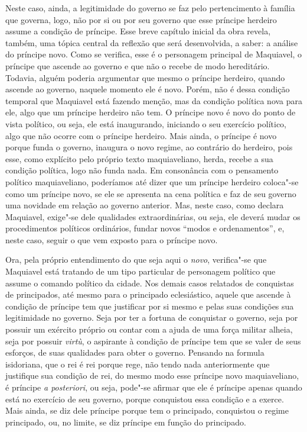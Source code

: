 Neste caso, ainda, a legitimidade do governo se faz pelo pertencimento à
família que governa, logo, não por si ou por seu governo que esse
príncipe herdeiro assume a condição de príncipe. Esse breve capítulo
inicial da obra revela, também, uma tópica central da reflexão que será
desenvolvida, a saber: a análise do príncipe novo. Como se verifica,
esse é o personagem principal de Maquiavel, o príncipe que ascende ao
governo e que não o recebe de modo hereditário. Todavia, alguém poderia
argumentar que mesmo o príncipe herdeiro, quando ascende ao governo,
naquele momento ele é novo. Porém, não é dessa condição temporal que
Maquiavel está fazendo menção, mas da condição política nova para ele,
algo que um príncipe herdeiro não tem. O príncipe novo é novo do ponto
de vista político, ou seja, ele está inaugurando, iniciando o seu
exercício político, algo que não ocorre com o príncipe herdeiro. Mais
ainda, o príncipe é novo porque funda o governo, inaugura o novo regime,
ao contrário do herdeiro, pois esse, como explícito pelo próprio texto
maquiaveliano, herda, recebe a sua condição política, logo não funda
nada. Em consonância com o pensamento político maquiaveliano, poderíamos
até dizer que um príncipe herdeiro coloca"-se como um príncipe novo, se
ele se apresenta na cena política e faz de seu governo uma novidade em
relação ao governo anterior. Mas, neste caso, como declara Maquiavel,
exige"-se dele qualidades extraordinárias, ou seja, ele deverá mudar os
procedimentos políticos ordinários, fundar novos ``modos e
ordenamentos'', e, neste caso, seguir o que vem exposto para o príncipe
novo.

Ora, pela próprio entendimento do que seja aqui o \emph{novo},
verifica"-se que Maquiavel está tratando de um tipo particular de
personagem político que assume o comando político da cidade. Nos demais
casos relatados de conquistas de principados, até mesmo para o
principado eclesiástico, aquele que ascende à condição de príncipe tem
que justificar por si mesmo e pelas suas condições sua legitimidade no
governo. Seja por ter a fortuna de conquistar o governo, seja por
possuir um exército próprio ou contar com a ajuda de uma força militar
alheia, seja por possuir \emph{virtù}, o aspirante à condição de
príncipe tem que se valer de seus esforços, de suas qualidades para
obter o governo. Pensando na formula isidoriana, que o rei é rei porque
rege, não tendo nada anteriormente que justifique sua condição de rei,
do mesmo modo esse príncipe novo maquiaveliano, é príncipe \emph{a
posteriori}, ou seja, pode"-se afirmar que ele é príncipe apenas quando
está no exercício de seu governo, porque conquistou essa condição e a
exerce. Mais ainda, se diz dele príncipe porque tem o principado,
conquistou o regime principado, ou, no limite, se diz príncipe em função
do principado.

